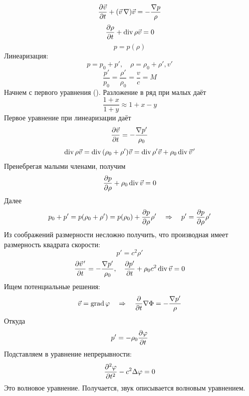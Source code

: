 \begin{equation}
    \pdv{\vec{v}}{t}+ \qty(\vec{v}\,\nabla)\vec{v} = - \frac{\nabla p}{\rho}
\end{equation}
\begin{equation}
    \pdv{\rho}{t}+\operatorname{div} \rho \vec{v} = 0
\end{equation}
\begin{equation}
    p=p(\rho)
\end{equation}
Линеаризация:
\begin{equation}
    p=p_0+p', \quad \rho = \rho_0+\rho', v'
\end{equation}
\begin{equation}
    \frac{p'}{p_0} = \frac{\rho'}{\rho_0} = \frac{v}{c} = M
\end{equation}
Начнем с первого уравнения (). Разложение в ряд при малых даёт
\begin{equation}
    \frac{1+x}{1+y}\approx 1+x-y
\end{equation}
Первое уравнение при линеаризации даёт
\begin{equation}
    \pdv{\vec{v}}{t} = -\frac{\nabla p'}{\rho_0}
\end{equation}
\begin{equation}
    \Div \rho \vec{v} = \Div \qty(\rho_0+\rho')\vec{v} =
    \Div \rho' \vec{v} + \rho_0 \Div \pvec{v}'
\end{equation}
Пренебрегая малыми членами, получим
\begin{equation}
    \pdv{p}{\rho}+\rho_0 \operatorname{div} \vec{v} = 0
\end{equation}
Далее
\begin{equation}
    p_0+p' = p (\rho_0 + \rho') = p (\rho_0)+ 
    \pdv{p}{\rho}\rho' 
    \quad\Rightarrow\quad 
    p' = \pdv{p}{\rho} \rho'
\end{equation}
Из соображений размерности несложно получить, что производная имеет
размерность квадрата скорости:
\begin{equation}
    p' = c^2 \rho ' 
\end{equation}
\begin{equation}
    \pdv{\pvec{v}'}{t} = -\frac{\nabla p'}{\rho_0}, \quad
    \pdv{p'}{t} + \rho_0 c^2 \Div \vec{v} = 0
\end{equation}
Ищем потенциальные решения:
\begin{equation}
    \vec{v} = \operatorname{grad} \varphi 
    \quad\Rightarrow\quad 
    \pdv{t} \nabla \Phi = -\frac{\nabla p'}{\rho}
\end{equation}
Откуда
\begin{equation}
    p' = -\rho_0 \pdv{\varphi}{t}
\end{equation}
Подставляем в уравнение непрерывности:
\begin{equation}
    \pdv[2]{\varphi}{t} - c^2 \Delta\varphi = 0
\end{equation}
Это волновое уравнение. Получается, звук описывается 
волновым уравнением. 

